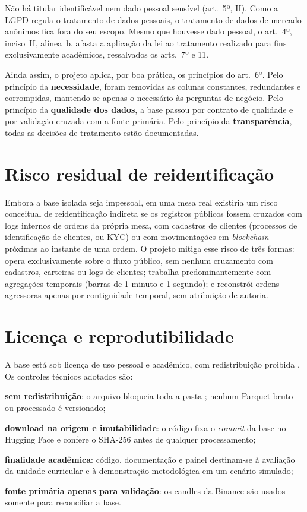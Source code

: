 Não há titular identificável nem dado pessoal sensível (art.~5º, II). Como a LGPD
regula o tratamento de dados pessoais, o tratamento de dados de mercado anônimos
fica fora do seu escopo. Mesmo que houvesse dado pessoal, o art.~4º, inciso~II,
alínea~b, afasta a aplicação da lei ao tratamento realizado para fins
exclusivamente acadêmicos, ressalvados os arts.~7º e 11.

Ainda assim, o projeto aplica, por boa prática, os princípios do art.~6º. Pelo
princípio da \textbf{necessidade}, foram removidas as colunas constantes,
redundantes e corrompidas, mantendo-se apenas o necessário às perguntas de
negócio. Pelo princípio da \textbf{qualidade dos dados}, a base passou por
contrato de qualidade e por validação cruzada com a fonte primária. Pelo
princípio da \textbf{transparência}, todas as decisões de tratamento estão
documentadas.

\section{Risco residual de reidentificação}\label{sec:reidentificacao}

Embora a base isolada seja impessoal, em uma mesa real existiria um risco
conceitual de reidentificação indireta se os registros públicos fossem cruzados
com logs internos de ordens da própria mesa, com cadastros de clientes
(processos de identificação de clientes, ou KYC) ou com movimentações em
\textit{blockchain} próximas ao instante de uma ordem. O projeto mitiga esse risco
de três formas: opera exclusivamente sobre o fluxo público, sem nenhum
cruzamento com cadastros, carteiras ou logs de clientes; trabalha
predominantemente com agregações temporais (barras de 1 minuto e 1 segundo); e
reconstrói ordens agressoras apenas por contiguidade temporal, sem atribuição de
autoria.

\section{Licença e reprodutibilidade}\label{sec:licenca}

A base está sob licença de uso pessoal e acadêmico, com redistribuição proibida
\cite{glitchlist2026}. Os controles técnicos adotados são:

\begin{alineas}
  \item \textbf{sem redistribuição}: o arquivo  bloqueia toda a
        pasta ; nenhum Parquet bruto ou processado é versionado;
  \item \textbf{download na origem e imutabilidade}: o código fixa o
        \textit{commit} da base no Hugging Face e confere o SHA-256 antes de
        qualquer processamento;
  \item \textbf{finalidade acadêmica}: código, documentação e painel destinam-se
        à avaliação da unidade curricular e à demonstração metodológica em um
        cenário simulado;
  \item \textbf{fonte primária apenas para validação}: os candles da Binance
        \cite{binance2025} são usados somente para reconciliar a base.
\end{alineas}

